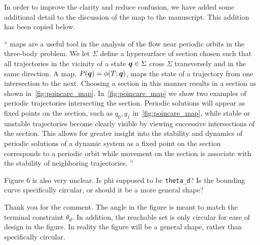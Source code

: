 \documentclass[11pt]{article}
\newenvironment{correction}{\begin{list}{}{\setlength{\leftmargin}{1cm}\setlength{\rightmargin}{1cm}}\vspace{\parsep}\item[]``}{''\end{list}}
\begin{document}
\begin{enumerate}
In order to improve the clarity and reduce confusion, we have added some additional detail to the discussion of the \Poincare map to the manuscript.
This addition has been copied below.
\begin{correction}
\Poincare maps are a useful tool in the analysis of the flow near periodic orbits in the three-body problem.
We let \( \Sigma \) define a hypersurface of section chosen such that all trajectories in the vicinity of a state \( \bm{q} \in \Sigma \) cross \( \Sigma \) transversely and in the same direction.
A \Poincare map, \( P(\bm{q}) = \phi(T;\bm{q}) \), maps the state of a trajectory from one intersection to the next.
Choosing a section in this manner results in a \Poincare section as shown in~\cref{fig:poincare_map}.
In~\cref{fig:poincare_map} we show two examples of periodic trajectories intersecting the \Poincare section. 
Periodic solutions will appear as fixed points on the section, such as \( q_0, q_1 \) in~\cref{fig:poincare_map}, while stable or unstable trajectories become clearly visible by viewing successive intersections of the section.
This allows for greater insight into the stability and dynamics of periodic solutions of a dynamic system as a fixed point on the \Poincare section corresponds to a periodic orbit while movement on the section is associate with the stability of neighboring trajectories. 
\end{correction}

\item
    \begin{itshape}
Figure 6 is also very unclear.  Is phi supposed to be \texttt{theta\_d}?  Is the bounding curve specifically circular, or should it be a more general shape?
\end{itshape}

Thank you for the comment.
The angle in the figure is meant to match the terminal constraint \( \theta_d\).
In addition, the reachable set is only circular for ease of design in the figure.
In reality the figure will be a general shape, rather than specifically circular.


\end{enumerate}
\end{document}
